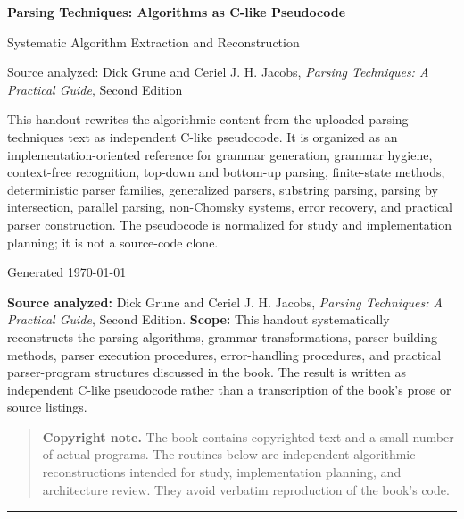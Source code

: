 \documentclass[10pt,letterpaper]{article}
\newcommand{\handouttitle}{Parsing Techniques: Algorithms as C-like Pseudocode}
\begin{document}
\begin{titlepage}
\centering
\vspace*{0.9in}
{\Huge\bfseries\color{HouseBlue}\handouttitle\par}
\vspace{0.22in}
{\Large Systematic Algorithm Extraction and Reconstruction\par}
\vspace{0.34in}
{\large Source analyzed: Dick Grune and Ceriel J. H. Jacobs, \emph{Parsing Techniques: A Practical Guide}, Second Edition\par}
\vfill
\begin{minipage}{0.88\textwidth}
\small
This handout rewrites the algorithmic content from the uploaded parsing-techniques text as independent C-like pseudocode. It is organized as an implementation-oriented reference for grammar generation, grammar hygiene, context-free recognition, top-down and bottom-up parsing, finite-state methods, deterministic parser families, generalized parsers, substring parsing, parsing by intersection, parallel parsing, non-Chomsky systems, error recovery, and practical parser construction. The pseudocode is normalized for study and implementation planning; it is not a source-code clone.
\end{minipage}
\vfill
{\large Generated \today\par}
\end{titlepage}
\clearpage
{}
\tableofcontents
\clearpage
{}


\textbf{Source analyzed:} Dick Grune and Ceriel J. H. Jacobs, \emph{Parsing Techniques: A Practical Guide}, Second Edition.
\textbf{Scope:} This handout systematically reconstructs the parsing algorithms, grammar transformations, parser-building methods, parser execution procedures, error-handling procedures, and practical parser-program structures discussed in the book. The result is written as independent C-like pseudocode rather than a transcription of the book's prose or source listings.

\begin{quote}
\textbf{Copyright note.} The book contains copyrighted text and a small number of actual programs. The routines below are independent algorithmic reconstructions intended for study, implementation planning, and architecture review. They avoid verbatim reproduction of the book's code.
\end{quote}

\medskip\hrule\medskip
\end{document}
